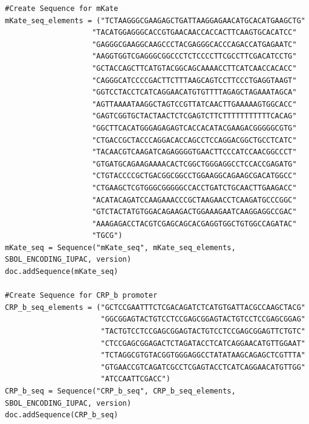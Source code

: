 \begin{minipage}{0.95\textwidth}
\begin{lstlisting}[basicstyle=\tt\footnotesize]
#Create Sequence for mKate
mKate_seq_elements = ("TCTAAGGGCGAAGAGCTGATTAAGGAGAACATGCACATGAAGCTG" 
                    "TACATGGAGGGCACCGTGAACAACCACCACTTCAAGTGCACATCC" 
                    "GAGGGCGAAGGCAAGCCCTACGAGGGCACCCAGACCATGAGAATC" 
                    "AAGGTGGTCGAGGGCGGCCCTCTCCCCTTCGCCTTCGACATCCTG" 
                    "GCTACCAGCTTCATGTACGGCAGCAAAACCTTCATCAACCACACC" 
                    "CAGGGCATCCCCGACTTCTTTAAGCAGTCCTTCCCTGAGGTAAGT" 
                    "GGTCCTACCTCATCAGGAACATGTGTTTTAGAGCTAGAAATAGCA" 
                    "AGTTAAAATAAGGCTAGTCCGTTATCAACTTGAAAAAGTGGCACC" 
                    "GAGTCGGTGCTACTAACTCTCGAGTCTTCTTTTTTTTTTTCACAG" 
                    "GGCTTCACATGGGAGAGAGTCACCACATACGAAGACGGGGGCGTG" 
                    "CTGACCGCTACCCAGGACACCAGCCTCCAGGACGGCTGCCTCATC" 
                    "TACAACGTCAAGATCAGAGGGGTGAACTTCCCATCCAACGGCCCT" 
                    "GTGATGCAGAAGAAAACACTCGGCTGGGAGGCCTCCACCGAGATG" 
                    "CTGTACCCCGCTGACGGCGGCCTGGAAGGCAGAAGCGACATGGCC" 
                    "CTGAAGCTCGTGGGCGGGGGCCACCTGATCTGCAACTTGAAGACC" 
                    "ACATACAGATCCAAGAAACCCGCTAAGAACCTCAAGATGCCCGGC" 
                    "GTCTACTATGTGGACAGAAGACTGGAAAGAATCAAGGAGGCCGAC" 
                    "AAAGAGACCTACGTCGAGCAGCACGAGGTGGCTGTGGCCAGATAC" 
                    "TGCG")
mKate_seq = Sequence("mKate_seq", mKate_seq_elements, SBOL_ENCODING_IUPAC, version)
doc.addSequence(mKate_seq)

#Create Sequence for CRP_b promoter
CRP_b_seq_elements = ("GCTCCGAATTTCTCGACAGATCTCATGTGATTACGCCAAGCTACG" 
                      "GGCGGAGTACTGTCCTCCGAGCGGAGTACTGTCCTCCGAGCGGAG" 
                      "TACTGTCCTCCGAGCGGAGTACTGTCCTCCGAGCGGAGTTCTGTC" 
                      "CTCCGAGCGGAGACTCTAGATACCTCATCAGGAACATGTTGGAAT" 
                      "TCTAGGCGTGTACGGTGGGAGGCCTATATAAGCAGAGCTCGTTTA" 
                      "GTGAACCGTCAGATCGCCTCGAGTACCTCATCAGGAACATGTTGG" 
                      "ATCCAATTCGACC")
CRP_b_seq = Sequence("CRP_b_seq", CRP_b_seq_elements, SBOL_ENCODING_IUPAC, version)
doc.addSequence(CRP_b_seq)
\end{lstlisting}
\end{minipage}

